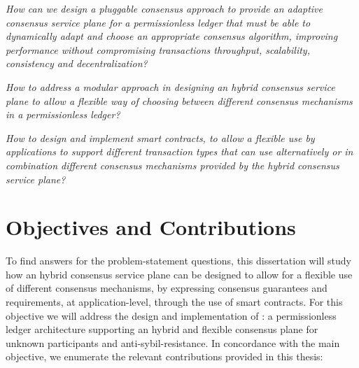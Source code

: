 \textit{How can we design a pluggable consensus approach to provide an adaptive consensus service plane for a permissionless ledger that must be able to dynamically adapt and choose an appropriate consensus algorithm, improving performance without compromising transactions throughput, scalability, consistency and decentralization?}

\textit{How to address a modular approach in designing an hybrid consensus service plane to allow a flexible way of choosing between different consensus mechanisms in a permissionless ledger?}

\textit{How to design and implement smart contracts, to allow a flexible use by applications to support different transaction types that can use alternatively or in combination different consensus mechanisms provided by the hybrid consensus service plane?}



\section{Objectives and Contributions}
\label{sub:intro-obj-contrib}

To find answers for the problem-statement questions, this dissertation will study how an hybrid consensus service plane can be designed to allow for a flexible use of different consensus mechanisms, by expressing consensus guarantees and requirements, at application-level, through the use of smart contracts. For this objective we will address the design and implementation of \mysystem: a permissionless ledger architecture supporting an hybrid and flexible consensus plane for unknown participants and anti-sybil-resistance. In concordance with the main objective, we enumerate the relevant contributions provided in this thesis:



